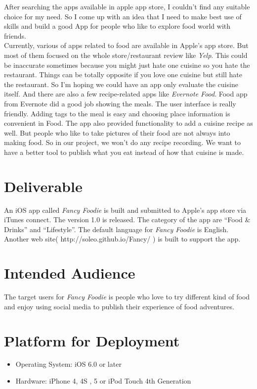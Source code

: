 After searching the apps available in apple app store, I couldn't find any suitable choice for my need. So I come up with an idea that I need to make best use of skills and build a good App for people who like to explore food world with friends. \\

Currently, various of apps related to food are available in Apple's app store. But most of them focused on the whole store/restaurant review like \emph{Yelp}. This could be inaccurate sometimes because you might just hate one cuisine so you hate the restaurant. Things can be totally opposite if you love one cuisine but still hate the restaurant. So I'm hoping we could have an app only evaluate the cuisine itself. And there are also a few recipe-related apps like \emph{Evernote Food}. Food app from Evernote did a good job showing the meals. The user interface is really friendly. Adding tags to the meal is easy and choosing place information is convenient in Food. The app also provided functionality to add a cuisine recipe as well. But people who like to take pictures of their food are not always into making food. So in our project, we won't do any recipe recording. We want to have a better tool to publish what you eat instead of how that cuisine is made.

\section{Deliverable} %
\label{sec:deliverable}
An iOS app called \emph{Fancy Foodie} is built and submitted to Apple's app store via iTunes connect. The version 1.0 is released. The category of the app are ``Food & Drinks'' and ``Lifestyle''. The default language for \emph{Fancy Foodie} is English. Another web site( http://soleo.github.io/Fancy/ ) is built to support the app.

\section{Intended Audience} %
\label{sec:intended_audience}
The target users for \emph{Fancy Foodie} is people who love to try different kind of food and enjoy using social media to publish their experience of food adventures.

\section{Platform for Deployment} %
\label{sec:platform_for_deployment}
\begin{itemize}
\item Operating System: iOS 6.0 or later
\item Hardware: iPhone 4, 4S , 5 or iPod Touch 4th Generation
\end{itemize}

